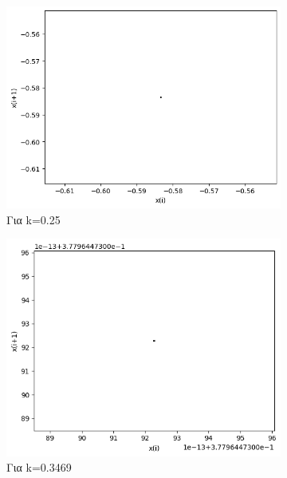 \begin{figure}[h!]
	\centering
	\caption{Διαγράμματα της τιμής \(x_i\) με την τιμή \(x_{i+1}\) :}
	\begin{subfigure}[b]{0.25\textwidth}
		\centering
		\includegraphics[width=\textwidth]{LateX images/graphs q07/g3}
		\caption{Για k=0.25}
		\label{f:k37}
	\end{subfigure}
	\hfill
	\begin{subfigure}[b]{0.25\textwidth}
		\centering
		\includegraphics[width=\textwidth]{LateX images/graphs q07/g4}
		\caption{Για k=0.3469}
		\label{f:k38}
	\end{subfigure}
	\hfill
	\begin{subfigure}[b]{0.25\textwidth}

\end{subfigure}
\end{figure}
